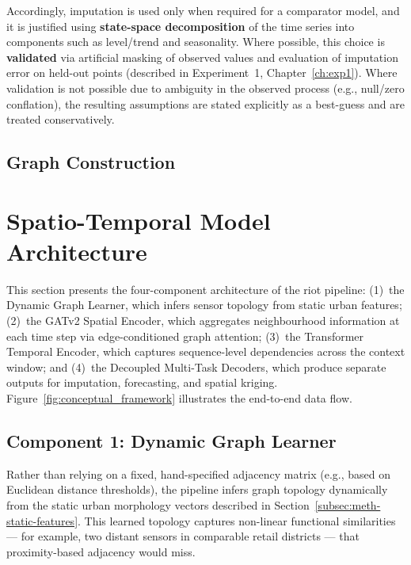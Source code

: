 Accordingly, imputation is used only when required for a comparator model, and it is justified using \textbf{state-space decomposition} of the time series into components such as level/trend and seasonality. Where possible, this choice is \textbf{validated} via artificial masking of observed values and evaluation of imputation error on held-out points (described in Experiment~1, Chapter~\ref{ch:exp1}). Where validation is not possible due to ambiguity in the observed process (e.g., null/zero conflation), the resulting assumptions are stated explicitly as a best-guess and are treated conservatively.

\subsection{Graph Construction}
\label{subsec:meth-graph}


\section{Spatio-Temporal Model Architecture}
\label{sec:meth-architecture}

This section presents the four-component architecture of the \gls{riot} pipeline: (1)~the Dynamic Graph Learner, which infers sensor topology from static urban features; (2)~the GATv2 Spatial Encoder, which aggregates neighbourhood information at each time step via edge-conditioned graph attention; (3)~the Transformer Temporal Encoder, which captures sequence-level dependencies across the context window; and (4)~the Decoupled Multi-Task Decoders, which produce separate outputs for imputation, forecasting, and spatial kriging. Figure~\ref{fig:conceptual_framework} illustrates the end-to-end data flow.

\subsection{Component 1: Dynamic Graph Learner}
\label{subsec:meth-graph-learner}

Rather than relying on a fixed, hand-specified adjacency matrix (e.g., based on Euclidean distance thresholds), the pipeline infers graph topology dynamically from the static urban morphology vectors described in Section~\ref{subsec:meth-static-features}. This learned topology captures non-linear functional similarities --- for example, two distant sensors in comparable retail districts --- that proximity-based adjacency would miss.

